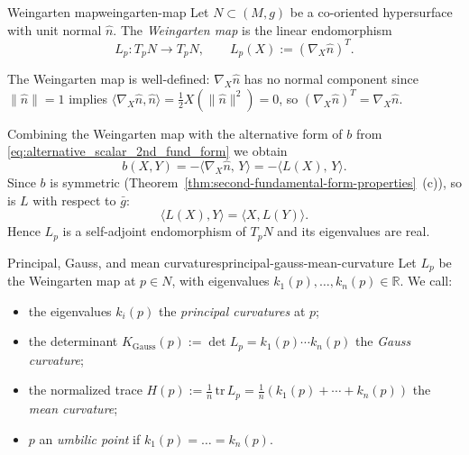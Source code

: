 







\begin{colordef}{Weingarten map}{weingarten-map}
Let $N \subset (M, g)$ be a co-oriented hypersurface with unit normal $\hat n$. The \emph{Weingarten map} is the linear endomorphism
\[
L_p \colon T_p N \to T_p N, \qquad L_p(X) := (\nabla_X \hat n)^T.
\]
\end{colordef}

The Weingarten map is well-defined: $\nabla_X \hat n$ has no normal component since $\|\hat n\| = 1$ implies $\langle \nabla_X \hat n, \hat n\rangle = \tfrac{1}{2} X(\|\hat n\|^2) = 0$, so $(\nabla_X \hat n)^T = \nabla_X \hat n$.

Combining the Weingarten map with the alternative form of $b$ from \eqref{eq:alternative_scalar_2nd_fund_form} we obtain
\[
b(X, Y) = -\langle \nabla_X \hat n,\, Y\rangle = -\langle L(X),\, Y\rangle.
\]
Since $b$ is symmetric (Theorem~\ref{thm:second-fundamental-form-properties}~(c)), so is $L$ with respect to $\bar g$:
\[
\langle L(X), Y\rangle = \langle X, L(Y)\rangle.
\]
Hence $L_p$ is a self-adjoint endomorphism of $T_p N$ and its eigenvalues are real. 

\begin{colordef}{Principal, Gauss, and mean curvatures}{principal-gauss-mean-curvature}
Let $L_p$ be the Weingarten map at $p \in N$, with eigenvalues $k_1(p), \ldots, k_n(p) \in \mathbb{R}$. We call:
\begin{itemize}
    \item the eigenvalues $k_i(p)$ the \emph{principal curvatures} at $p$;
    \item the determinant $K_{\mathrm{Gauss}}(p) := \det L_p = k_1(p) \cdots k_n(p)$ the \emph{Gauss curvature};
    \item the normalized trace $H(p) := \tfrac{1}{n}\,\mathrm{tr}\,L_p = \tfrac{1}{n}(k_1(p) + \cdots + k_n(p))$ the \emph{mean curvature};
    \item $p$ an \emph{umbilic point} if $k_1(p) = \dots = k_n(p)$.
\end{itemize}
\end{colordef}



